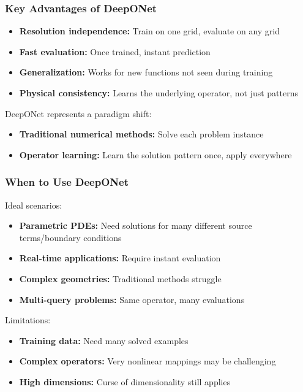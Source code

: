 \documentclass[notes]{beamer}
\begin{document}
\begin{frame}
\frametitle{Key Advantages of DeepONet}

\begin{itemize}
	\item \textbf{Resolution independence:} Train on one grid, evaluate on any grid
    \item \textbf{Fast evaluation:} Once trained, instant prediction
    \item \textbf{Generalization:} Works for new functions not seen during training  
    \item \textbf{Physical consistency:} Learns the underlying operator, not just patterns
\end{itemize}

\vspace{1cm}

\begin{block}{DeepONet represents a paradigm shift:}
\begin{itemize}
    \item \textbf{Traditional numerical methods:} Solve each problem instance
    \item \textbf{Operator learning:} Learn the solution pattern once, apply everywhere
\end{itemize}
\end{block}
\end{frame}

\begin{frame}
\frametitle{When to Use DeepONet}

\begin{block}{Ideal scenarios:}
\begin{itemize}
    \item \textbf{Parametric PDEs:} Need solutions for many different source terms/boundary conditions
    \item \textbf{Real-time applications:} Require instant evaluation
    \item \textbf{Complex geometries:} Traditional methods struggle
    \item \textbf{Multi-query problems:} Same operator, many evaluations
\end{itemize}
\end{block}

\begin{alertblock}{Limitations:}
\begin{itemize}
    \item \textbf{Training data:} Need many solved examples
    \item \textbf{Complex operators:} Very nonlinear mappings may be challenging
    \item \textbf{High dimensions:} Curse of dimensionality still applies
\end{itemize}
\end{alertblock}

\end{frame}
\end{document}
